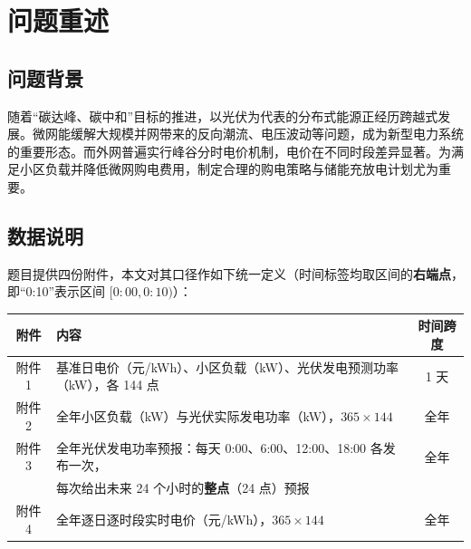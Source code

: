 \documentclass{cumcmthesis}
\begin{document}
\begin{abstract}
    针对问题四，改用附件 4 的逐日波动电价重算问题二与问题三。全年费用分别为\textbf{14\,634\,080.5 元}（+4.91\%）与\textbf{14\,210\,954.8 元}（+4.57\%）。受控分解表明，涨价并非源于日内峰谷比升高（窗口均价反而由 0.7662 降至 0.7575），\textbf{97.2\%} 的增量来自\textbf{逐日电价漂移}：日购电量与当日电价水平的相关系数达 $+0.9651$，即“高负载日恰为高电价日”，而储能容量远不足以跨日套利。\newline \hspace*{2em}
    本文最后给出灵敏度与稳健性分析、模型的评价与推广。所有结果均由 \texttt{run\_all.py} 一键复现，数值与图表见交付文件 \texttt{result1\~{}4*.xlsx}。
\end{abstract}

\section{问题重述}
\subsection{问题背景}
随着“碳达峰、碳中和”目标的推进，以光伏为代表的分布式能源正经历跨越式发展。微网能缓解大规模并网带来的反向潮流、电压波动等问题，成为新型电力系统的重要形态。而外网普遍实行峰谷分时电价机制，电价在不同时段差异显著。为满足小区负载并降低微网购电费用，制定合理的购电策略与储能充放电计划尤为重要。

\subsection{数据说明}
题目提供四份附件，本文对其口径作如下统一定义（时间标签均取区间的\textbf{右端点}，即“0:10”表示区间 $[0{:}00,0{:}10)$）：

\begin{center}
\small
\begin{tabular}{clc}
\hline
附件 & 内容 & 时间跨度 \\
\hline
附件 1 & 基准日电价（元/kWh）、小区负载（kW）、光伏发电预测功率（kW），各 144 点 & 1 天 \\
附件 2 & 全年小区负载（kW）与光伏实际发电功率（kW），$365\times144$ & 全年 \\
附件 3 & 全年光伏发电功率预报：每天 0:00、6:00、12:00、18:00 各发布一次， & 全年 \\
       & 每次给出未来 24 个小时的\textbf{整点}（24 点）预报 & \\
附件 4 & 全年逐日逐时段实时电价（元/kWh），$365\times144$ & 全年 \\
\hline
\end{tabular}
\end{center}
\end{document}
